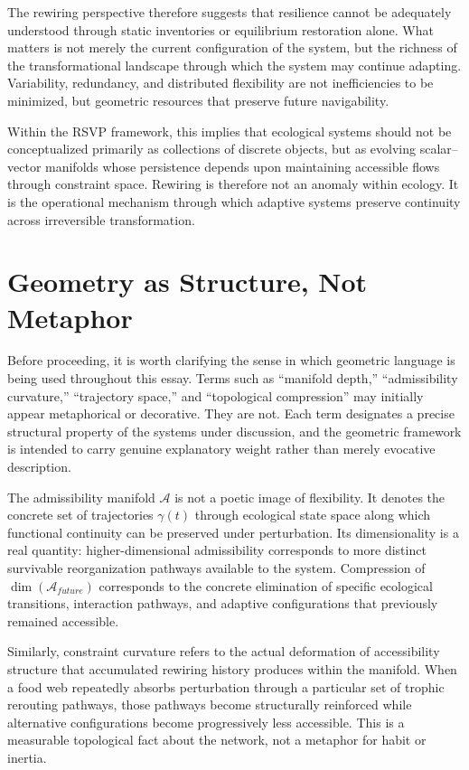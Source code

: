 \documentclass[11pt,a4paper]{article}
\newcommand{\Aspace}{\mathcal{A}}
\begin{document}
The rewiring perspective therefore suggests that resilience cannot be adequately understood through static inventories or equilibrium restoration alone. What matters is not merely the current configuration of the system, but the richness of the transformational landscape through which the system may continue adapting. Variability, redundancy, and distributed flexibility are not inefficiencies to be minimized, but geometric resources that preserve future navigability.

Within the RSVP framework, this implies that ecological systems should not be conceptualized primarily as collections of discrete objects, but as evolving scalar--vector manifolds whose persistence depends upon maintaining accessible flows through constraint space. Rewiring is therefore not an anomaly within ecology. It is the operational mechanism through which adaptive systems preserve continuity across irreversible transformation.

\newpage

\section{Geometry as Structure, Not Metaphor}

Before proceeding, it is worth clarifying the sense in which geometric language is being used throughout this essay. Terms such as ``manifold depth,'' ``admissibility curvature,'' ``trajectory space,'' and ``topological compression'' may initially appear metaphorical or decorative. They are not. Each term designates a precise structural property of the systems under discussion, and the geometric framework is intended to carry genuine explanatory weight rather than merely evocative description.

The admissibility manifold $\Aspace$ is not a poetic image of flexibility. It denotes the concrete set of trajectories $\gamma(t)$ through ecological state space along which functional continuity can be preserved under perturbation. Its dimensionality is a real quantity: higher-dimensional admissibility corresponds to more distinct survivable reorganization pathways available to the system. Compression of $\dim(\Aspace_{future})$ corresponds to the concrete elimination of specific ecological transitions, interaction pathways, and adaptive configurations that previously remained accessible.

Similarly, constraint curvature refers to the actual deformation of accessibility structure that accumulated rewiring history produces within the manifold. When a food web repeatedly absorbs perturbation through a particular set of trophic rerouting pathways, those pathways become structurally reinforced while alternative configurations become progressively less accessible. This is a measurable topological fact about the network, not a metaphor for habit or inertia.
\end{document}
